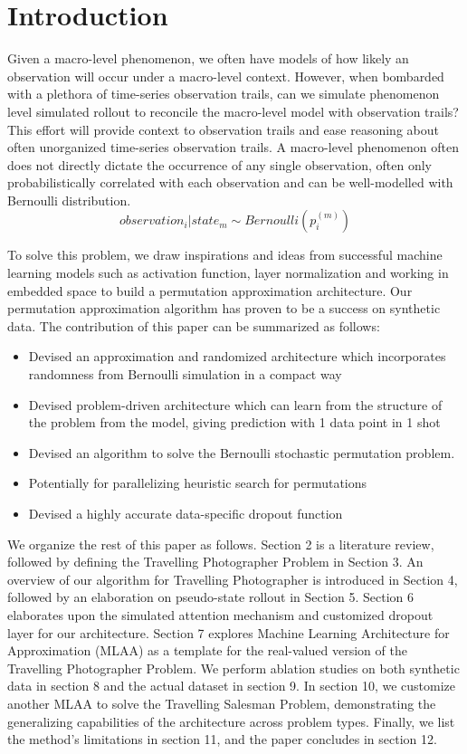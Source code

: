 \documentclass[10pt, conference, compsocconf]{IEEEtran}
\begin{document}
\section{Introduction}
Given a macro-level phenomenon, we often have models of how likely an observation will occur under a macro-level context. However, when bombarded with a plethora of time-series observation trails, can we simulate phenomenon level simulated rollout to reconcile the macro-level model with observation trails? This effort will provide context to observation trails and ease reasoning about often unorganized time-series observation trails. A macro-level phenomenon often does not directly dictate the occurrence of any single observation, often only probabilistically correlated with each observation and can be well-modelled with Bernoulli distribution. 
$$observation_i | state_m \sim Bernoulli(p_i^{(m)})$$

To solve this problem, we draw inspirations and ideas from successful machine learning models such as activation function, layer normalization and working in embedded space to build a permutation approximation architecture. Our permutation approximation algorithm has proven to be a success on synthetic data. The contribution of this paper can be summarized as follows:

\begin{itemize}
    \item Devised an approximation and randomized architecture which incorporates randomness from Bernoulli simulation in a compact way
    \item Devised problem-driven architecture which can learn from the structure of the problem from the model, giving prediction with 1 data point in 1 shot
    \item Devised an algorithm to solve the Bernoulli stochastic permutation problem.
    \item Potentially for parallelizing heuristic search for permutations
    \item Devised a highly accurate data-specific dropout function
\end{itemize}
We organize the rest of this paper as follows. Section 2 is a literature review, followed by defining the Travelling Photographer Problem in Section 3. An overview of our algorithm for Travelling Photographer is introduced in Section 4, followed by an elaboration on pseudo-state rollout in Section 5. Section 6 elaborates upon the simulated attention mechanism and customized dropout layer for our architecture. Section 7 explores Machine Learning Architecture for Approximation (MLAA) as a template for the real-valued version of the Travelling Photographer Problem. We perform ablation studies on both synthetic data in section 8 and the actual dataset in section 9. In section 10, we customize another MLAA to solve the Travelling Salesman Problem, demonstrating the generalizing capabilities of the architecture across problem types. Finally, we list the method's limitations in section 11, and the paper concludes in section 12. 
\end{document}

